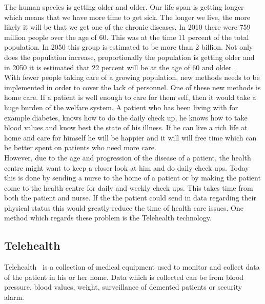 The human species is getting older and older. Our life span is getting longer which means that we have more time to get sick. The longer we live, the more likely it will be that we get one of the chronic diseases. In 2010 there were 759 million people over the age of 60. This was at the time 11 percent of the total population. In 2050 this group is estimated to be more than 2 billion. Not only does the population increase, proportionally the population is getting older and in 2050 it is estimated that 22 percent will be at the age of 60 and older~\cite{UNpub}.\\
With fewer people taking care of a growing population, new methods needs to be implemented in order to cover the lack of personnel. One of these new methods is home care. If a patient is well enough to care for them self, then it would take a huge burden of the welfare system. A patient who has been living with for example diabetes, knows how to do the daily check up, he knows how to take blood values and know best the state of his illness. If he can live a rich life at home and care for himself he will be happier and it will will free time which can be better spent on patients who need more care.\\
However, due to the age and progression of the disease of a patient, the health centre might want to keep a closer look at him and do daily check ups. Today this is done by sending a nurse to the home of a patient or by making the patient come to the health centre for daily and weekly check ups. This takes time from both the patient and nurse. If the the patient could send in data regarding their physical status this would greatly reduce the time of health care issues. One method which regards these problem is the Telehealth technology.\\

\subsection{Telehealth}
\label{sub:telehealth}
Telehealth~\cite{telehealth} is a collection of medical equipment used to monitor and collect data of the patient in his or her home. Data which is collected can be from blood pressure, blood values, weight, surveillance of demented patients or security alarm.\\

